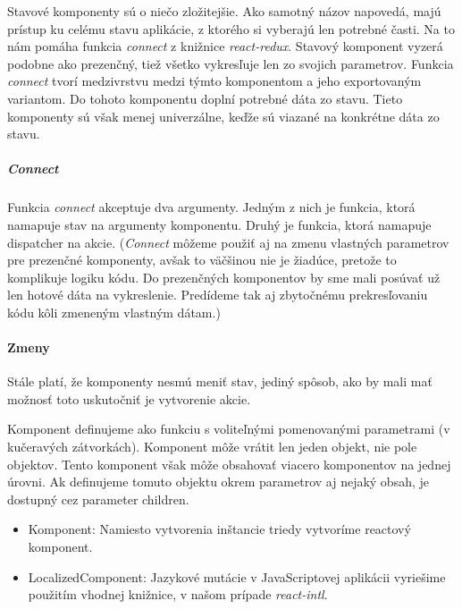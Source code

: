 Stavové komponenty sú o niečo zložitejšie. Ako samotný názov napovedá, majú prístup ku celému stavu aplikácie, z ktorého si vyberajú len potrebné časti. Na to nám pomáha funkcia \emph{connect} z knižnice \emph{react-redux}. Stavový komponent vyzerá podobne ako prezenčný, tiež všetko vykresľuje len zo svojich parametrov. 
Funkcia \emph{connect} tvorí medzivrstvu medzi týmto komponentom a jeho exportovaným variantom. Do tohoto komponentu doplní potrebné dáta zo stavu. Tieto komponenty sú však menej univerzálne, keďže sú viazané na konkrétne dáta zo stavu.

\subparagraph{Connect}
\label{func:connect}%
Funkcia \emph{connect} akceptuje dva argumenty. Jedným z nich je funkcia, ktorá namapuje stav na argumenty komponentu. Druhý je funkcia, ktorá namapuje dispatcher na akcie. %
(\emph{Connect} môžeme použiť aj na zmenu vlastných parametrov pre prezenčné komponenty, avšak to väčšinou nie je žiadúce, pretože to komplikuje logiku kódu. Do prezenčných komponentov by sme mali posúvať už len hotové dáta na vykreslenie. Predídeme tak aj zbytočnému prekresľovaniu kódu kôli zmeneným vlastným dátam.)

\paragraph{Zmeny}

%

Stále platí, že komponenty nesmú meniť stav, jediný spôsob, ako by mali mať možnosť toto uskutočniť je vytvorenie akcie.

Komponent definujeme ako funkciu s voliteľnými pomenovanými parametrami (v kučeravých zátvorkách). %
Komponent môže vrátit len jeden objekt, nie pole objektov. Tento komponent však môže obsahovať viacero komponentov na jednej úrovni.
Ak definujeme tomuto objektu okrem parametrov aj nejaký obsah, je dostupný cez parameter children.%

\begin{itemize}
\item {Komponent}: Namiesto vytvorenia inštancie triedy vytvoríme reactový komponent.

\item {LocalizedComponent}: Jazykové mutácie v JavaScriptovej aplikácii vyriešime použitím vhodnej knižnice, v našom prípade \emph{react-intl}. %
\end{itemize}

